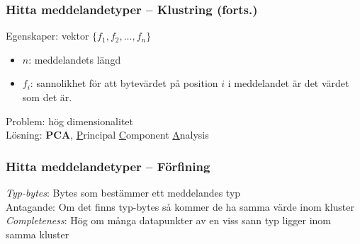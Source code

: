 \documentclass[xetex]{beamer}
\begin{document}
    \begin{frame}
        \frametitle{Hitta meddelandetyper -- Klustring (forts.)}
        Egenskaper: vektor $\{f_1, f_2, ..., f_n\}$
        \begin{itemize}
            \item $n$: meddelandets längd
            \item $f_i$: sannolikhet för att bytevärdet på position $i$ i
                meddelandet är det värdet som det är.
        \end{itemize}
        \vskip20pt
        Problem: hög dimensionalitet \\
        Lösning: \textbf{PCA}, \scriptsize{\underline{P}rincipal
            \underline{C}omponent \underline{A}nalysis}
    \end{frame}
    \begin{frame}
        \frametitle{Hitta meddelandetyper -- Förfining}
        \emph{Typ-bytes}: Bytes som bestämmer ett meddelandes typ \\
        \vskip15pt
        Antagande: Om det finns typ-bytes så kommer de ha samma värde inom
            kluster \\
        \vskip15pt
        \emph{Completeness}: Hög om många datapunkter av en viss sann typ
            ligger inom samma kluster
    \end{frame}
\end{document}
